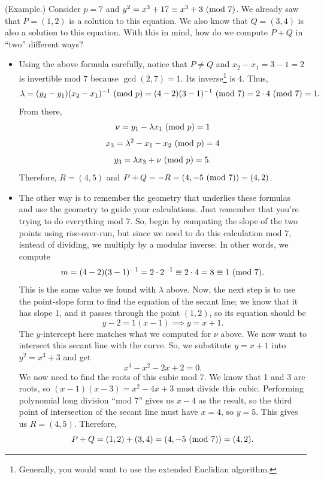 \documentclass[letterpaper]{article}
\begin{document}
\begin{mdframed}
    (Example.) Consider $p = 7$ and $y^2 = x^3 + 17 \equiv x^3 + 3 \ (\mathrm{mod}\ 7)$. We already saw that $P = (1, 2)$ is a solution to this equation. We also know that $Q = (3, 4)$ is also a solution to this equation. With this in mind, how do we compute $P + Q$ in ``two'' different ways?
    \begin{itemize}
        \item Using the above formula carefully, notice that $P \neq Q$ and $x_2 - x_1 = 3 - 1 = 2$ is invertible mod 7 because $\gcd(2, 7) = 1$. Its inverse\footnote{Generally, you would want to use the extended Euclidian algorithm.} is 4. Thus, 
        \[\lambda = (y_2 - y_1)(x_2 - x_1)^{-1} \ (\mathrm{mod}\ p) = (4 - 2)(3 - 1)^{-1} \ (\mathrm{mod}\ 7) = 2 \cdot 4 \ (\mathrm{mod}\ 7) = 1.\]
        From there, 
        \[\nu = y_1 - \lambda x_1 \ (\mathrm{mod}\ p) = 1\]
        \[x_3 = \lambda^2 - x_1 - x_2 \ (\mathrm{mod}\ p) = 4\]
        \[y_3 = \lambda x_3 + \nu \ (\mathrm{mod}\ p) = 5.\]
        Therefore, $R = (4, 5)$ and $P + Q = -R = (4, -5 \ (\mathrm{mod}\ 7)) = (4, 2)$. 

        \item The other way is to remember the geometry that underlies these formulas and use the geometry to guide your calculations. Just remember that you're trying to do everything mod 7. So, begin by computing the slope of the two points using rise-over-run, but since we need to do this calculation mod 7, isntead of dividing, we multiply by a modular inverse. In other words, we compute 
        \[m = (4 - 2)(3 - 1)^{-1} = 2 \cdot 2^{-1} \equiv 2 \cdot 4 = 8 \equiv 1 \ (\mathrm{mod}\ 7).\]
        This is the same value we found with $\lambda$ above. Now, the next step is to use the point-slope form to find the equation of the secant line; we know that it has slope 1, and it passes through the point $(1, 2)$, so its equation should be \[y - 2 = 1(x - 1) \implies y = x + 1.\]
        The $y$-intercept here matches what we computed for $\nu$ above. We now want to intersect this secant line with the curve. So, we substitute $y = x + 1$ into $y^2 = x^3 + 3$ and get \[x^3 - x^2 - 2x + 2 = 0.\]
        We now need to find the roots of this cubic mod 7. We know that 1 and 3 are roots, so $(x - 1)(x - 3) = x^2 - 4x + 3$ must divide this cubic. Performing polynomial long division ``mod 7'' gives us $x - 4$ as the result, so the third point of intersection of the secant line must have $x = 4$, so $y = 5$. This gives us $R = (4, 5)$. Therefore, 
        \[P + Q = (1, 2) + (3, 4) = (4, -5 \ (\mathrm{mod}\ 7)) = (4, 2).\]
    \end{itemize}
\end{mdframed}
\end{document}
